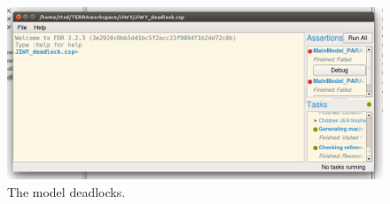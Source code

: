\documentclass[a4paper,twoside,11pt]{article}
\begin{document}
\begin{figure}
	\centering
	\includegraphics[width=\textwidth]{./images/4-1_fdr.png}
	\caption{The model deadlocks.}
	\label{fig:4_1_fdr}
\end{figure}
\end{document}
